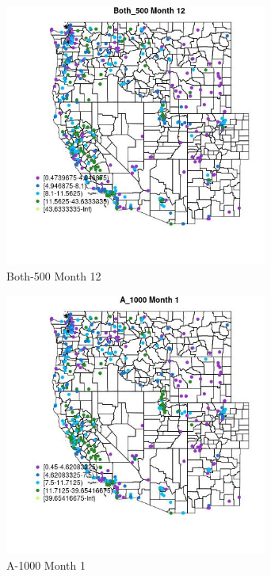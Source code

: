\clearpage 

\begin{figure} 
\centering  
\includegraphics[width=0.77\textwidth]{Code_Outputs/ML_input_report_ML_input_PM25_Step5_part_d_de_duplicated_aves_ML_input_MapObsMo12Both_500.jpg} 
\caption{\label{fig:ML_input_report_ML_input_PM25_Step5_part_d_de_duplicated_aves_ML_inputMapObsMo12Both_500}Both-500 Month 12} 
\end{figure} 
 

\begin{figure} 
\centering  
\includegraphics[width=0.77\textwidth]{Code_Outputs/ML_input_report_ML_input_PM25_Step5_part_d_de_duplicated_aves_ML_input_MapObsMo1A_1000.jpg} 
\caption{\label{fig:ML_input_report_ML_input_PM25_Step5_part_d_de_duplicated_aves_ML_inputMapObsMo1A_1000}A-1000 Month 1} 
\end{figure} 
 

